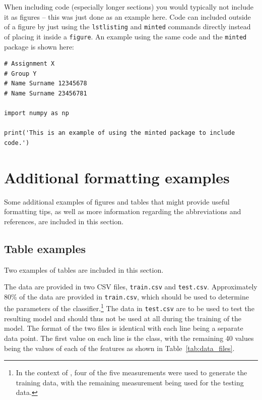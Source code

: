 \documentclass[a4paper, onecolumn, 12pt]{IEEEtran}
\begin{document}
When including code (especially longer sections) you would typically not include it as figures -- this was just done as an example here. Code can included outside of a figure by just using the \verb|lstlisting| and \verb|minted| commands directly instead of placing it inside a \verb|figure|. An example using the same code and the \verb|minted| package is shown here:

\begin{verbatim}
# Assignment X
# Group Y
# Name Surname 12345678
# Name Surname 23456781

import numpy as np

print('This is an example of using the minted package to include code.')
\end{verbatim}

\section{Additional formatting examples}
\label{app:formatting}

Some additional examples of figures and tables that might provide useful formatting tips, as well as more information regarding the abbreviations and references, are included in this section.

\subsection{Table examples}
\label{app:tables}

Two examples of tables are included in this section.

The data are provided in two \ac{CSV} files, \verb|train.csv| and \verb|test.csv|.
Approximately 80\% of the data are provided in \verb|train.csv|, which should be used to
determine the parameters of the classifier.\footnote{\small In the context of
  \cite{SamuelduPlessis_sei_access}, four of the five measurements were used to generate
  the training data, with the remaining measurement being used for the testing data.}  The
data in \verb|test.csv| are to be used to test the resulting model and should thus not be
used at all during the training of the model.  The format of the two files is identical
with each line being a separate data point.  The first value on each line is the class,
with the remaining 40 values being the values of each of the features as shown in
Table~\ref{tab:data_files}.
\end{document}
